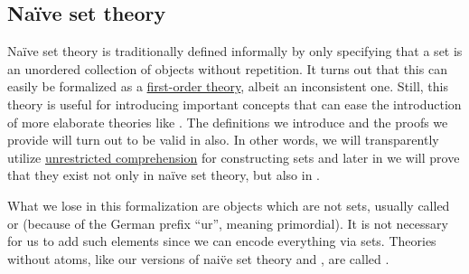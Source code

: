\subsection{Na\"ive set theory}\label{subsec:naive_set_theory}

Na\"ive set theory is traditionally defined informally by only specifying that a set is an unordered collection of objects without repetition. It turns out that this can easily be formalized as a \hyperref[def:first_order_theory]{first-order theory}, albeit an inconsistent one. Still, this theory is useful for introducing important concepts that can ease the introduction of more elaborate theories like \hyperref[def:zfc]{}. The definitions we introduce and the proofs we provide will turn out to be valid in  also. In other words, we will transparently utilize \hyperref[def:naive_set_theory/unrestricted_comprehension]{unrestricted comprehension} for constructing sets and later in  we will prove that they exist not only in na\"ive set theory, but also in .

\begin{remark}\label{rem:pure_set_theory}
  What we lose in this formalization are objects which are not sets, usually called  or  (because of the German prefix \enquote{ur}, meaning primordial). It is not necessary for us to add such elements since we can encode everything via sets. Theories without atoms, like our versions of nai\"ve set theory and \hyperref[def:axiom_of_universes]{}, are called .
\end{remark}

